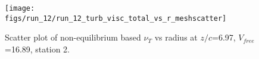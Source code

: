 \begin{figure}[H]
\centering
\texttt{[image: figs/run\_12/run\_12\_turb\_visc\_total\_vs\_r\_meshscatter]}
\caption{Scatter plot of non-equilibrium based $\nu_T$ vs radius at $z/c$=6.97, $V_{free}$=16.89, station 2.}
\label{fig:run_12_turb_visc_total_vs_r_meshscatter}
\end{figure}


